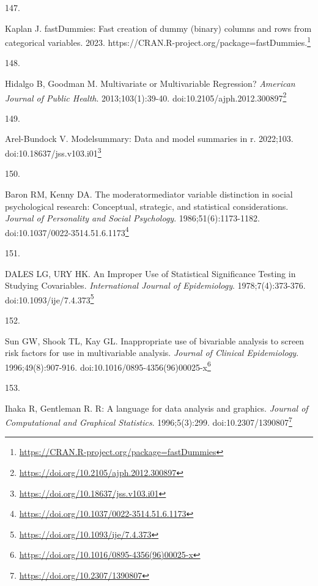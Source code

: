 \documentclass[
]{book}
\newlength{\cslhangindent}
\newlength{\csllabelwidth}
\newlength{\cslentryspacingunit} %
\newenvironment{CSLReferences}[2] %
 {%
  \setlength{\parindent}{0pt}
  \ifodd #1
  \let\oldpar\par
  \def\par{\hangindent=\cslhangindent\oldpar}
  \fi
  \setlength{\parskip}{#2\cslentryspacingunit}
 }%
 {}
\newcommand{\CSLLeftMargin}[1]{\parbox[t]{\csllabelwidth}{#1}}
\newcommand{\CSLRightInline}[1]{\parbox[t]{\linewidth - \csllabelwidth}{#1}\break}
\renewcommand{\href}[2]{#2\footnote{\url{#1}}}
\begin{document}
\begin{CSLReferences}{0}{0}
\leavevmode{}%
\CSLLeftMargin{147. }%
\CSLRightInline{Kaplan J. fastDummies: Fast creation of dummy (binary) columns and rows from categorical variables. 2023. \href{https://CRAN.R-project.org/package=fastDummies}{https://CRAN.R-project.org/package=fastDummies.}}

\leavevmode{}%
\CSLLeftMargin{148. }%
\CSLRightInline{Hidalgo B, Goodman M. Multivariate or Multivariable Regression? \emph{American Journal of Public Health}. 2013;103(1):39-40. doi:\href{https://doi.org/10.2105/ajph.2012.300897}{10.2105/ajph.2012.300897}}

\leavevmode{}%
\CSLLeftMargin{149. }%
\CSLRightInline{Arel-Bundock V. {\textbraceleft}Modelsummary{\textbraceright}: Data and model summaries in {\textbraceleft}r{\textbraceright}. 2022;103. doi:\href{https://doi.org/10.18637/jss.v103.i01}{10.18637/jss.v103.i01}}

\leavevmode{}%
\CSLLeftMargin{150. }%
\CSLRightInline{Baron RM, Kenny DA. The moderator{\textendash}mediator variable distinction in social psychological research: Conceptual, strategic, and statistical considerations. \emph{Journal of Personality and Social Psychology}. 1986;51(6):1173-1182. doi:\href{https://doi.org/10.1037/0022-3514.51.6.1173}{10.1037/0022-3514.51.6.1173}}

\leavevmode{}%
\CSLLeftMargin{151. }%
\CSLRightInline{DALES LG, URY HK. An Improper Use of Statistical Significance Testing in Studying Covariables. \emph{International Journal of Epidemiology}. 1978;7(4):373-376. doi:\href{https://doi.org/10.1093/ije/7.4.373}{10.1093/ije/7.4.373}}

\leavevmode{}%
\CSLLeftMargin{152. }%
\CSLRightInline{Sun GW, Shook TL, Kay GL. Inappropriate use of bivariable analysis to screen risk factors for use in multivariable analysis. \emph{Journal of Clinical Epidemiology}. 1996;49(8):907-916. doi:\href{https://doi.org/10.1016/0895-4356(96)00025-x}{10.1016/0895-4356(96)00025-x}}

\leavevmode{}%
\CSLLeftMargin{153. }%
\CSLRightInline{Ihaka R, Gentleman R. R: A language for data analysis and graphics. \emph{Journal of Computational and Graphical Statistics}. 1996;5(3):299. doi:\href{https://doi.org/10.2307/1390807}{10.2307/1390807}}


\end{CSLReferences}
\end{document}
